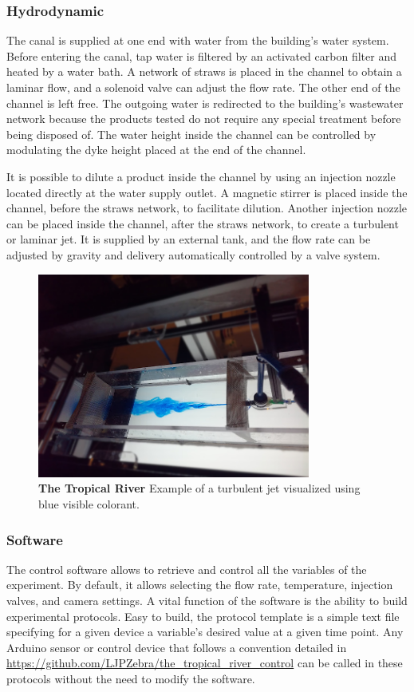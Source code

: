   \subsubsection{Hydrodynamic}
  The canal is supplied at one end with water from the building's water system. Before entering the canal, tap water is filtered by an activated carbon filter and heated by a water bath. A network of straws is placed in the channel to obtain a laminar flow, and a solenoid valve can adjust the flow rate. The other end of the channel is left free. The outgoing water is redirected to the building's wastewater network because the products tested do not require any special treatment before being disposed of. The water height inside the channel can be controlled by modulating the dyke height placed at the end of the channel.

  It is possible to dilute a product inside the channel by using an injection nozzle located directly at the water supply outlet. A magnetic stirrer is placed inside the channel, before the straws network, to facilitate dilution. Another injection nozzle can be placed inside the channel, after the straws network, to create a turbulent or laminar jet. It is supplied by an external tank, and the flow rate can be adjusted by gravity and delivery automatically controlled by a valve system.

    \begin{figure}[h]
      \centering
      \includegraphics[width=0.80\textwidth]{part_2/assets/river_flow.jpg}
      \caption{\textbf{The Tropical River} Example of a turbulent jet visualized using blue visible colorant.}
    \end{figure}

  \subsubsection{Software}
  The control software allows to retrieve and control all the variables of the experiment. By default, it allows selecting the flow rate, temperature, injection valves, and camera settings. A vital function of the software is the ability to build experimental protocols. Easy to build, the protocol template is a simple text file specifying for a given device a variable's desired value at a given time point. Any Arduino sensor or control device that follows a convention detailed in \url{https://github.com/LJPZebra/the_tropical_river_control} can be called in these protocols without the need to modify the software.

